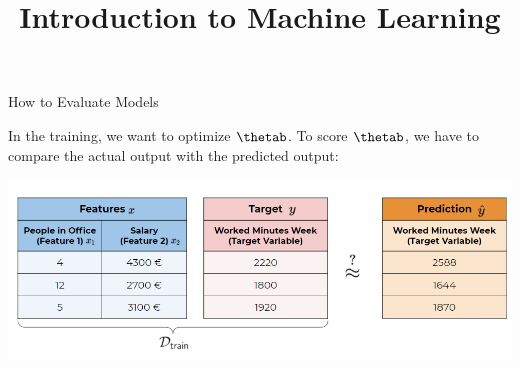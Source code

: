 \documentclass[11pt,compress,t,notes=noshow, xcolor=table]{beamer}
\title{Introduction to Machine Learning}
\institute{\href{https://compstat-lmu.github.io/lecture_i2ml/}{compstat-lmu.github.io/lecture\_i2ml}}
\date{}
\begin{document}
















\begin{frame}{How to Evaluate Models}

In the training, we want to optimize $\thetab$. To score $\thetab$, we have to compare the actual output with the predicted output: 

\scriptsize



\lz\lz
\begin{center}\includegraphics[width=\textwidth]{figure_man/ml-basics-riskmin-eval.png} \end{center}


\lz\lz
\end{frame}
\end{document}

